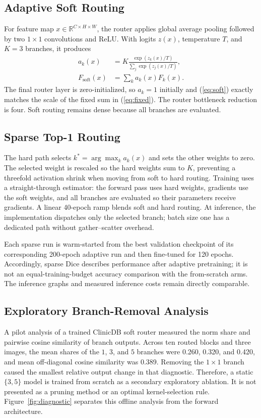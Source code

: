 \documentclass[conference]{IEEEtran}
\begin{document}
\subsection{Adaptive Soft Routing}
For feature map $x\in\mathbb{R}^{C\times H\times W}$, the router applies global average pooling followed by two $1\times1$ convolutions and ReLU. With logits $z(x)$, temperature $T$, and $K=3$ branches, it produces
\begin{equation}
\begin{aligned}
    a_k(x)&=K\frac{\exp(z_k(x)/T)}{\sum_j\exp(z_j(x)/T)},\\
    F_{\mathrm{soft}}(x)&=\sum_k a_k(x)F_k(x).
\end{aligned}
    \label{eq:soft}
\end{equation}
The final router layer is zero-initialized, so $a_k=1$ initially and (\ref{eq:soft}) exactly matches the scale of the fixed sum in (\ref{eq:fixed}). The router bottleneck reduction is four. Soft routing remains dense because all branches are evaluated.

\subsection{Sparse Top-1 Routing}
The hard path selects $k^*=\arg\max_k a_k(x)$ and sets the other weights to zero. The selected weight is rescaled so the hard weights sum to $K$, preventing a threefold activation shrink when moving from soft to hard routing. Training uses a straight-through estimator: the forward pass uses hard weights, gradients use the soft weights, and all branches are evaluated so their parameters receive gradients. A linear 40-epoch ramp blends soft and hard routing. At inference, the implementation dispatches only the selected branch; batch size one has a dedicated path without gather--scatter overhead.

Each sparse run is warm-started from the best validation checkpoint of its corresponding 200-epoch adaptive run and then fine-tuned for 120 epochs. Accordingly, sparse Dice describes performance after adaptive pretraining; it is not an equal-training-budget accuracy comparison with the from-scratch arms. The inference graphs and measured inference costs remain directly comparable.

\subsection{Exploratory Branch-Removal Analysis}
A pilot analysis of a trained ClinicDB soft router measured the norm share and pairwise cosine similarity of branch outputs. Across ten routed blocks and three images, the mean shares of the $1$, $3$, and $5$ branches were 0.260, 0.320, and 0.420, and mean off-diagonal cosine similarity was 0.389. Removing the $1\times1$ branch caused the smallest relative output change in that diagnostic. Therefore, a static $\{3,5\}$ model is trained from scratch as a secondary exploratory ablation. It is not presented as a pruning method or an optimal kernel-selection rule.
Figure~\ref{fig:diagnostic} separates this offline analysis from the forward architecture.
\end{document}
